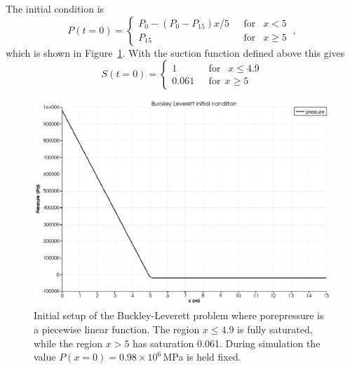 \documentclass[]{scrreprt}
\begin{document}
The initial condition is
\begin{equation}
P(t=0) = \left\{
\begin{array}{ll}
P_{0} - (P_{0}-P_{15})x/5 & \ \ \ \mbox{for }\ \ x<5 \\
P_{15} & \ \ \ \mbox{for }\ \ x\geq 5  
\end{array}
\right. \ ,
\end{equation}
which is shown in
Figure~\ref{bl_setup.figa}.  With the suction function defined above
this gives
\begin{equation}
S(t=0) = \left\{
\begin{array}{ll}
1 & \ \ \ \mbox{for }\ \ x\leq 4.9 \\
0.061 & \ \ \ \mbox{for} \ \ x \geq 5
\end{array}
\right.
\end{equation}

\begin{figure}[htb]
\begin{center}
\includegraphics[width=12cm]{bl_initial.eps}
\caption{Initial setup of the Buckley-Leverett problem where
  porepressure is a piecewise linear function.  The region
$x\leq 4.9$ is fully saturated, while the region $x>5$ has saturation
  0.061.  During simulation the value $P(x=0)=0.98\times 10^{6}$\,MPa
  is held fixed.}
\label{bl_setup.figa}
\end{center}
\end{figure}
\end{document}
